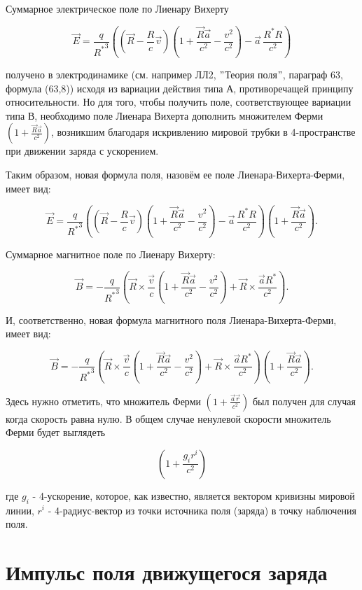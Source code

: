 \documentclass[11pt]{article}
\begin{document}
Суммарное электрическое поле по Лиенару Вихерту

\[\vec{E} = \frac{q}{{{R}^{*}}^{3}}\left( \left(\vec{R}-\frac{R}{c}\vec{v} \right) \left(1 + \frac{\vec{R}\vec{a}}{c^2} - \frac{v^2}{c^2} \right) - \vec{a}\,\frac{{R}^{*}R}{c^2} \right)\]

получено в электродинамике (см. например ЛЛ2, \("\)Теория поля\("\),
параграф 63, формула (63,8)) исходя из вариации действия типа А,
противоречащей принципу относительности. Но для того, чтобы получить
поле, соответствующее вариации типа В, необходимо поле Лиенара Вихерта
дополнить множителем Ферми
\(\left(1 + \frac{\vec{R}\vec{a}}{c^2}\right)\), возникшим благодаря
искривлению мировой трубки в 4-пространстве при движении заряда с
ускорением.

Таким образом, новая формула поля, назовём ее поле
Лиенара-Вихерта-Ферми, имеет вид:

\[\vec{E} = \frac{q}{{{R}^{*}}^{3}}\left( \left(\vec{R}-\frac{R}{c}\vec{v} \right) \left(1 + \frac{\vec{R}\vec{a}}{c^2} - \frac{v^2}{c^2} \right) - \vec{a}\,\frac{{R}^{*}R}{c^2} \right) \left(1 + \frac{\vec{R}\vec{a}}{c^2}\right).\]

Суммарное магнитное поле по Лиенару Вихерту:

\[\vec{B} = -\frac{q}{{{R}^{*}}^3}\left(\vec{R}\times\frac{\vec{v}}{c}\left(1 + \frac{\vec{R}\vec{a}}{c^2} - \frac{v^2}{c^2}\right) + \vec{R}\times\frac{\vec{a}{{R}^{*}}}{c^2}\right).\]

И, соответственно, новая формула магнитного поля Лиенара-Вихерта-Ферми,
имеет вид:

\[\vec{B} = -\frac{q}{{{R}^{*}}^3}\left(\vec{R}\times\frac{\vec{v}}{c}\left(1 + \frac{\vec{R}\vec{a}}{c^2} - \frac{v^2}{c^2}\right) + \vec{R}\times\frac{\vec{a}{{R}^{*}}}{c^2}\right) \left(1 + \frac{\vec{R}\vec{a}}{c^2}\right).\]

    Здесь нужно отметить, что множитель Ферми
\(\left( 1 + \frac{\vec a \vec r}{c^2}\right)\) был получен для случая
когда скорость равна нулю. В общем случае ненулевой скорости множитель
Ферми будет выглядеть

\[\left( 1 + \frac{g_i r^i}{c^2}\right)\]

где \(g_i\) - 4-ускорение, которое, как известно, является вектором
кривизны мировой линии, \(r^i\) - 4-радиус-вектор из точки источника
поля (заряда) в точку наблючения поля.

    \section{Импульс поля движущегося
заряда}\label{ux438ux43cux43fux443ux43bux44cux441-ux43fux43eux43bux44f-ux434ux432ux438ux436ux443ux449ux435ux433ux43eux441ux44f-ux437ux430ux440ux44fux434ux430}
\end{document}
